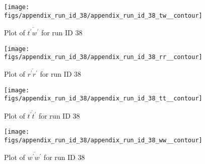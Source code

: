 \begin{figure}[H]
\centering
\texttt{[image: figs/appendix\_run\_id\_38/appendix\_run\_id\_38\_tw\_\_contour]}
\caption{Plot of $\overline{t^\prime w^\prime}$ for run ID 38}
\label{fig:appendix_run_id_38_tw__contour}
\end{figure}


\begin{figure}[H]
\centering
\texttt{[image: figs/appendix\_run\_id\_38/appendix\_run\_id\_38\_rr\_\_contour]}
\caption{Plot of $\overline{r^\prime r^\prime}$ for run ID 38}
\label{fig:appendix_run_id_38_rr__contour}
\end{figure}


\begin{figure}[H]
\centering
\texttt{[image: figs/appendix\_run\_id\_38/appendix\_run\_id\_38\_tt\_\_contour]}
\caption{Plot of $\overline{t^\prime t^\prime}$ for run ID 38}
\label{fig:appendix_run_id_38_tt__contour}
\end{figure}


\begin{figure}[H]
\centering
\texttt{[image: figs/appendix\_run\_id\_38/appendix\_run\_id\_38\_ww\_\_contour]}
\caption{Plot of $\overline{w^\prime w^\prime}$ for run ID 38}
\label{fig:appendix_run_id_38_ww__contour}
\end{figure}


